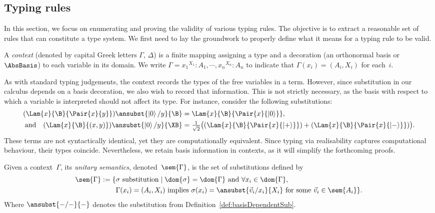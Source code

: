 \subsection{Typing rules}    
In this section, we focus on enumerating and proving the validity of various
typing rules. The objective is to extract a reasonable set of rules that can
constitute a type system. We first need to lay the groundwork to properly define
what it means for a typing rule to be valid.

\begin{definition}
  A \emph{context} (denoted by capital Greek letters $\Gamma$, $\Delta$) is a
  finite mapping assigning a type and a decoration (an orthonormal basis or $\AbsBasis$)
  to each variable in its domain. We write
  \(
    \Gamma = {x_1}^{{X_1}}:A_1,\dotsb, {x_n}^{{X_n}}:A_n
  \)
  to indicate that $\Gamma(x_i)=(A_i,X_i)$ for each~$i$.
\end{definition}

As with standard typing judgements, the context records the types of the free
variables in a term. However, since substitution in our calculus depends on a basis
decoration, we also wish to record that information. This is not strictly necessary,
as the basis with respect to which a variable is interpreted should not affect its
type. For instance, consider the following substitutions:
\begin{align*}
(\Lam{x}{\B}{\Pair{x}{y}})\ansubst{\ket{0}/y}{\B}
  &= \Lam{x}{\B}{\Pair{x}{\ket{0}}},\\
\text{and}\quad
(\Lam{x}{\B}{(x, y)})\ansubst{\ket{0}/y}{\XB}
  &= \tfrac{1}{\sqrt{2}}
    \bigl((\Lam{x}{\B}{\Pair{x}{\ket{+}}})
         + (\Lam{x}{\B}{\Pair{x}{\ket{-}}})\bigr).
\end{align*}
These terms are not syntactically identical, yet they are computationally
equivalent. 
Since typing via realisability captures computational behaviour,
their types coincide. Nevertheless, we retain basis information in contexts, as
it will simplify the forthcoming proofs.

\begin{definition}
  Given a context~$\Gamma$, its \emph{unitary semantics},
  denoted~$\sem{\Gamma}$, is the set of substitutions defined by
  \begin{align*}
    \sem{\Gamma}
    := 
    \{&\sigma~\text{substitution} \mid 
      \dom{\sigma} = \dom{\Gamma}
      \text{ and } \forall {x_i} \in \dom{\Gamma},\\
      &\Gamma(x_i) = (A_i, X_i)
      \text{ implies }
      \sigma(x_i) = \ansubst{\vec{v}_{i}/x_i}{{X_i}}
      \text{ for some }\vec{v}_{i} \in \sem{A_i}\}.
  \end{align*}
  Where $\ansubst{\--/\--}{\--}$ denotes the substitution from 
  Definition~\ref{def:basisDependentSub}.
\end{definition}


